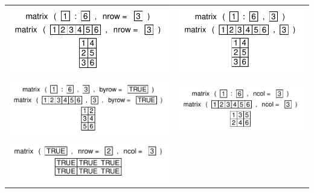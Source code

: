 \documentclass[pdflatex]{article}
\begin{document}
\begin{tabular}{cc}
\includegraphics{matrix} & \includegraphics{matrix_arg}\\
\includegraphics{matrix_byrow} & \includegraphics{matrix_nbcol}\\
\includegraphics{matrix_logical} &
\end{tabular}
\end{document}
